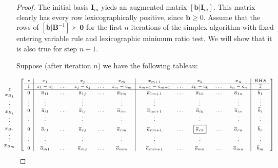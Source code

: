 \begin{proof} The initial basis $\mathbf{I}_m$ yieds an augmented matrix $[\mathbf{b} | \mathbf{I}_m]$. This matrix clearly has every row lexicographically positive, since $\mathbf{b} \geq 0$. Assume that the rows of $[\overline{\mathbf{b}} |\mathbf{B}^{-1}] \succ \mathbf{0}$ for the first $n$ iterations of the simplex algorithm with fixed entering variable rule and lexicographic minimum ratio test. We will show that it is also true for step $n+1$. 

Suppose (after iteration $n$) we have the following tableau:
\begin{table}[h!]
\centering
\begin{displaymath}
\scriptsize\hspace*{-3em}
\begin{array}{c}\\
z\\
x_{B_1}\\
\vdots\\
x_{B_i}\\
\vdots\\
x_{B_r}\\
\vdots\\
x_{B_m}
\end{array}
\left[
\begin{array}{c|ccccc|ccccc|c}
z & x_1 & \dots & x_j & \dots & x_m & x_{m+1} & \dots & x_k & \dots & x_n & RHS\\
\hline
1 & z_1 - c_1 & \dots & z_j - c_j & \dots & z_m - c_m & z_{m+1} - c_{m+1} & \dots & z_k - c_k & \dots & z_{n} - c_{n} & \overline{z}\\
\hline
0 & \overline{a}_{11} & \dots & \overline{a}_{1j} & \dots & \overline{a}_{1m} & \overline{a}_{1m+1} & \dots & \overline{a}_{1k} & \dots & \overline{a}_{1n} & \overline{b}_1\\
\vdots & \vdots & &\vdots & &\vdots & \vdots & & \vdots & & \vdots & \vdots\\
0 & \overline{a}_{i1} & \dots & \overline{a}_{ij} & \dots & \overline{a}_{im} & \overline{a}_{im+1} & \dots & \overline{a}_{ik} & \dots & \overline{a}_{in} & \overline{b}_i\\
\vdots & \vdots & &\vdots & &\vdots & \vdots & & \vdots & & \vdots & \vdots\\
0 & \overline{a}_{r1} & \dots & \overline{a}_{rj} & \dots & \overline{a}_{rm} & \overline{a}_{rm+1} & \dots & \fbox{$\overline{a}_{rk}$} & \dots & \overline{a}_{rn} & \overline{b}_r\\
\vdots & \vdots & &\vdots & &\vdots & \vdots & & \vdots & & \vdots & \vdots\\
0 & \overline{a}_{m1} & \dots & \overline{a}_{mj} & \dots & \overline{a}_{mm} & \overline{a}_{mm+1} & \dots & \overline{a}_{mk} & \dots & \overline{a}_{mn} & \overline{b}_m
\end{array}
\right]
\normalsize
\end{displaymath}
\caption{Tableau used for Proof of Lemma \ref{lem:LexiPositiveTableau}}
\label{tab:LexiTableau}
\end{table}



\end{proof}
